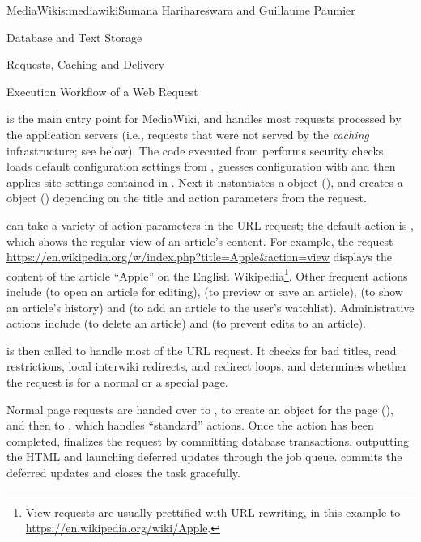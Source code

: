 \begin{aosachapter}{MediaWiki}{s:mediawiki}{Sumana Harihareswara and Guillaume Paumier}
\begin{aosasect1}{Database and Text Storage}
\end{aosasect1}

\begin{aosasect1}{Requests, Caching and Delivery}

\begin{aosasect2}{Execution Workflow of a Web Request}

 is the main entry point for MediaWiki, and handles
most requests processed by the application servers (i.e., requests that
were not served by the \emph{caching} infrastructure; see below). The
code executed from  performs security checks, loads
default configuration settings from
, guesses configuration with
 and then applies site settings contained in
. Next it instantiates a 
object (), and creates a  object
() depending on the title and action parameters from
the request.

 can take a variety of action parameters in the URL
request; the default action is , which shows the regular
view of an article's content. For example, the request
\url{https://en.wikipedia.org/w/index.php?title=Apple\&action=view}
displays the content of the article ``Apple'' on the English
Wikipedia\footnote{View requests are usually prettified with URL
  rewriting, in this example to
  \url{https://en.wikipedia.org/wiki/Apple}.}. Other frequent actions
include  (to open an article for editing), 
(to preview or save an article),  (to show an article's
history) and  (to add an article to the user's
watchlist). Administrative actions include  (to delete an
article) and  (to prevent edits to an article).

 is then called to handle most of
the URL request. It checks for bad titles, read restrictions, local
interwiki redirects, and redirect loops, and determines whether the
request is for a normal or a special page.

Normal page requests are handed over to
, to create an 
object for the page (), and then to
, which handles ``standard''
actions. Once the action has been completed,
 finalizes the request by committing
database transactions, outputting the HTML and launching deferred
updates through the job queue.  commits
the deferred updates and closes the task gracefully.


\end{aosasect2}
\end{aosasect1}
\end{aosachapter}

